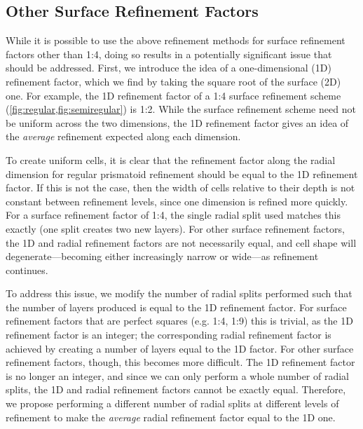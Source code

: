 \subsection{Other Surface Refinement Factors} \label{chap:5:factors}
While it is possible to use the above refinement methods for surface refinement factors other than 1:4, doing so results in a potentially significant issue that should be addressed.
First, we introduce the idea of a one-dimensional (1D) refinement factor, which we find by taking the square root of the surface (2D) one.
For example, the 1D refinement factor of a 1:4 surface refinement scheme (\cref{fig:regular,fig:semiregular}) is 1:2.
While the surface refinement scheme need not be uniform across the two dimensions, the 1D refinement factor gives an idea of the \textit{average} refinement expected along each dimension.


To create uniform cells, it is clear that the refinement factor along the radial dimension for regular prismatoid refinement should be equal to the 1D refinement factor.
If this is not the case, then the width of cells relative to their depth is not constant between refinement levels, since one dimension is refined more quickly.
For a surface refinement factor of 1:4, the single radial split used matches this exactly (one split creates two new layers).
For other surface refinement factors, the 1D and radial refinement factors are not necessarily equal, and cell shape will degenerate---becoming either increasingly narrow or wide---as refinement continues.


To address this issue, we modify the number of radial splits performed such that the number of layers produced is equal to the 1D refinement factor.
For surface refinement factors that are perfect squares (e.g.
1:4, 1:9) this is trivial, as the 1D refinement factor is an integer; the corresponding radial refinement factor is achieved by creating a number of layers equal to the 1D factor.
For other surface refinement factors, though, this becomes more difficult.
The 1D refinement factor is no longer an integer, and since we can only perform a whole number of radial splits, the 1D and radial refinement factors cannot be exactly equal.
Therefore, we propose performing a different number of radial splits at different levels of refinement to make the \textit{average} radial refinement factor equal to the 1D one.


